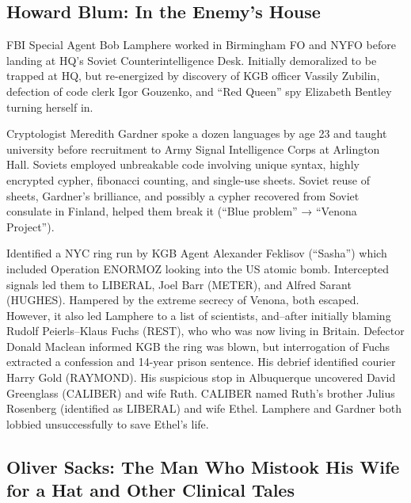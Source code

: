 \documentclass[
]{article}
\begin{document}
\hypertarget{howard-blum-in-the-enemys-house}{%
\subsection{Howard Blum: In the Enemy's
House}\label{howard-blum-in-the-enemys-house}}

FBI Special Agent Bob Lamphere worked in Birmingham FO and NYFO before
landing at HQ's Soviet Counterintelligence Desk. Initially demoralized
to be trapped at HQ, but re-energized by discovery of KGB officer
Vassily Zubilin, defection of code clerk Igor Gouzenko, and ``Red
Queen'' spy Elizabeth Bentley turning herself in.

Cryptologist Meredith Gardner spoke a dozen languages by age 23 and
taught university before recruitment to Army Signal Intelligence Corps
at Arlington Hall. Soviets employed unbreakable code involving unique
syntax, highly encrypted cypher, fibonacci counting, and single-use
sheets. Soviet reuse of sheets, Gardner's brilliance, and possibly a
cypher recovered from Soviet consulate in Finland, helped them break it
(``Blue problem'' → ``Venona Project'').

Identified a NYC ring run by KGB Agent Alexander Feklisov (``Sasha'')
which included Operation ENORMOZ looking into the US atomic bomb.
Intercepted signals led them to LIBERAL, Joel Barr (METER), and Alfred
Sarant (HUGHES). Hampered by the extreme secrecy of Venona, both
escaped. However, it also led Lamphere to a list of scientists,
and--after initially blaming Rudolf Peierls--Klaus Fuchs (REST), who who
was now living in Britain. Defector Donald Maclean informed KGB the ring
was blown, but interrogation of Fuchs extracted a confession and 14-year
prison sentence. His debrief identified courier Harry Gold (RAYMOND).
His suspicious stop in Albuquerque uncovered David Greenglass (CALIBER)
and wife Ruth. CALIBER named Ruth's brother Julius Rosenberg (identified
as LIBERAL) and wife Ethel. Lamphere and Gardner both lobbied
unsuccessfully to save Ethel's life.

\hypertarget{oliver-sacks-the-man-who-mistook-his-wife-for-a-hat-and-other-clinical-tales}{%
\subsection{Oliver Sacks: The Man Who Mistook His Wife for a Hat and
Other Clinical
Tales}\label{oliver-sacks-the-man-who-mistook-his-wife-for-a-hat-and-other-clinical-tales}}
\end{document}
